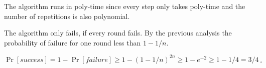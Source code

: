 \begin{itemize}
\begin{enumerate}
    \end{enumerate}
    
    The algorithm runs in poly-time since every step only takes poly-time and the number of repetitions is also polynomial. 
    
    The algorithm only fails, if every round fails. By the previous analysis the probability of failure for one round less than $1 - 1/n$.
    
    $\Pr[\textit{success}] = 
    1 -\Pr[\textit{failure}] \geq 
    1 - (1 - 1/n)^{2n} \geq
    1 - e^{-2} \geq 
    1 - 1/4 =
    3/4 ~ _\square$
    
    \end{itemize}

\pagebreak